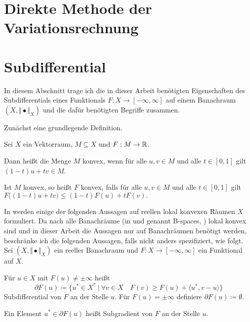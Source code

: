 \section{Direkte Methode der Variationsrechnung}

\section{Subdifferential}
In diesem Abschnitt trage ich die in dieser Arbeit benötigten Eigenschaften 
des Subdifferentials eines Funktionals $F:X\to [-\infty,\infty]$ 
auf einem Banachraum 
$(X,\Vert\bullet\Vert_X)$ und die dafür benötigten Begriffe zusammen.

Zunächst eine grundlegende Definition.

\begin{definition}
  Sei $X$ ein Vektorraum, $M\subseteq X$ und $F:M\to\mathbb{R}$. 
  
  Dann heißt die Menge $M$ konvex, wenn für alle $u,v\in M$ und alle $t\in
  [0,1]$ gilt $(1-t)u+tv\in M$.

  Ist $M$ konvex, so heißt $F$ konvex, falls für alle $u,v\in M$ und alle
  $t\in[0,1]$ gilt $F\big( (1-t)u+tv\big)\leq (1-t)F(u)+t F(v).$
\end{definition}

In \cite{Zei85} werden einige der folgenden Aussagen auf reellen lokal konvexen
Räumen $X$ formuliert.
Da nach \cite[S. 781, (43)]{Zei86} alle Banachräume 
(in \cite{Zei86} und \cite{Zei85} genannt \glqq B-spaces\grqq, \cite[S.
786]{Zei86}) lokal
konvex sind und in dieser Arbeit die Aussagen nur auf Banachräumen benötigt
werden, beschränke ich
die folgenden Aussagen, falls nicht anders spezifiziert, wie folgt.
Sei $(X,\Vert\bullet\Vert_X)$ ein reeller Banachraum und
$F:X\to [-\infty,\infty]$ ein Funktional auf $X$.

\begin{definition}
  Für $u\in X$ mit $F(u)\neq\pm\infty$ heißt
  \begin{equation}
    \label{equ:subdifferential}
    \partial F(u)\coloneq 
    \{u^\ast\in X^\ast\ |\ 
    \forall v\in X\quad F(v)\geq F(u)+\langle u^\ast,v-u\rangle\}  
  \end{equation}
  Subdifferential von $F$ an der Stelle $u$. Für $F(u)=\pm\infty$ definiere
  $\partial F(u)\coloneq\emptyset$.

  Ein Element $u^\ast\in\partial F(u)$ heißt Subgradient von $F$ an der Stelle
  $u$.
\end{definition}

